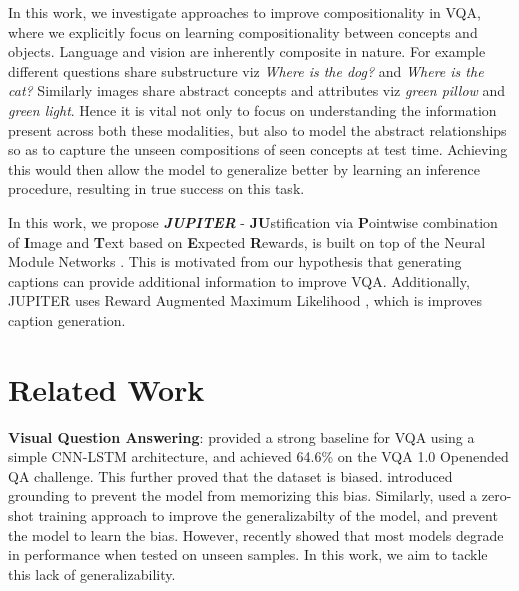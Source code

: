 In this work, we investigate approaches to improve compositionality in VQA, where we explicitly focus on learning compositionality between concepts and objects. Language and vision are inherently composite in nature. For example different questions share substructure viz \textit{Where is the dog?} and \textit{Where is the cat?} Similarly images share abstract concepts and attributes viz \textit{green pillow} and \textit{green light}. Hence it is vital not only to focus on understanding the information present across both these modalities, but also to model the abstract relationships so as to capture the unseen compositions of seen concepts at test time. Achieving this would then allow the model to generalize better by learning an inference procedure, resulting in true success on this task.

In this work, we propose \textbf{\textit{JUPITER}} - \textbf{JU}stification via \textbf{P}ointwise combination of \textbf{I}mage and \textbf{T}ext based on \textbf{E}xpected \textbf{R}ewards, is built on top of the Neural Module Networks \cite{HuARDS17}. This is motivated from our hypothesis that generating captions can provide additional information to improve VQA. Additionally, JUPITER uses Reward Augmented Maximum Likelihood \cite{RAML}, which is improves caption generation.

\section{Related Work}
\noindent\textbf{Visual Question Answering}: \cite{KazemiE17} provided a strong baseline for VQA using a simple CNN-LSTM architecture, and achieved 64.6\% on the VQA 1.0 Openended QA challenge. This further proved that the dataset is biased. \cite{AishAgrawal17} introduced grounding to prevent the model from memorizing this bias. Similarly, \cite{li2018zero} used a zero-shot training approach to improve the generalizabilty of the model, and prevent the model to learn the bias. However, recently \cite{AgrawalKBP17} showed that most models degrade in performance when tested on unseen samples. In this work, we aim to tackle this lack of generalizability.
\\

